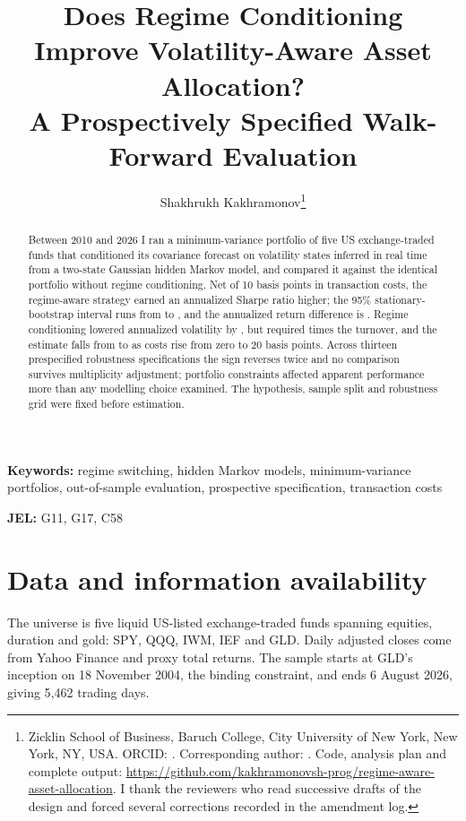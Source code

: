 \documentclass[11pt,letterpaper]{article}
\title{Does Regime Conditioning Improve Volatility-Aware Asset
Allocation?\\[0.3em]
\large A Prospectively Specified Walk-Forward Evaluation}
\author{Shakhrukh Kakhramonov\thanks{%
Zicklin School of Business, Baruch College, City University of New York,
New York, NY, USA.
ORCID: \orcidID{}.
Corresponding author: \correspondingEmail{}.
Code, analysis plan and complete output:
\url{https://github.com/kakhramonovsh-prog/regime-aware-asset-allocation}.
I thank the reviewers who read successive drafts of the design and
forced several corrections recorded in the amendment log.}}
\date{\releaseDate}
\begin{document}
\maketitle

\begin{abstract}
\noindent
Between 2010 and 2026 I ran a minimum-variance portfolio of five US
exchange-traded funds that conditioned its covariance forecast on
volatility states inferred in real time from a two-state Gaussian hidden
Markov model, and compared it against the identical portfolio without
regime conditioning. Net of 10 basis points in transaction costs, the
regime-aware strategy earned an annualized Sharpe ratio
\primarySharpeDiff{} higher; the 95\% stationary-bootstrap interval runs
from \primaryCiLower{} to \primaryCiUpper{}, and the annualized return
difference is \hacAnnualReturnDiff{}. Regime conditioning lowered
annualized volatility by \volDifferenceMagnitude{}, but required
\turnoverRatio{} times the turnover, and the estimate falls from
\diffAtZeroBps{} to \diffAtTwentyBps{} as costs rise from
zero to 20 basis points. Across thirteen prespecified robustness
specifications the sign reverses twice and no comparison survives
multiplicity adjustment; portfolio constraints affected apparent
performance more than any modelling choice examined. The hypothesis,
sample split and robustness grid were fixed before estimation.
\end{abstract}

\vspace{0.5em}
\noindent\textbf{Keywords:} regime switching, hidden Markov models,
minimum-variance portfolios, out-of-sample evaluation, prospective specification,
transaction costs

\vspace{0.3em}
\noindent\textbf{JEL:} G11, G17, C58



\section{Data and information availability}
\label{sec:data}

The universe is five liquid US-listed exchange-traded funds spanning
equities, duration and gold: SPY, QQQ, IWM, IEF and GLD. Daily adjusted
closes come from Yahoo Finance and proxy total returns. The sample
starts at GLD's inception on 18 November 2004, the binding constraint,
and ends 6 August 2026, giving 5{,}462 trading days.
\end{document}
